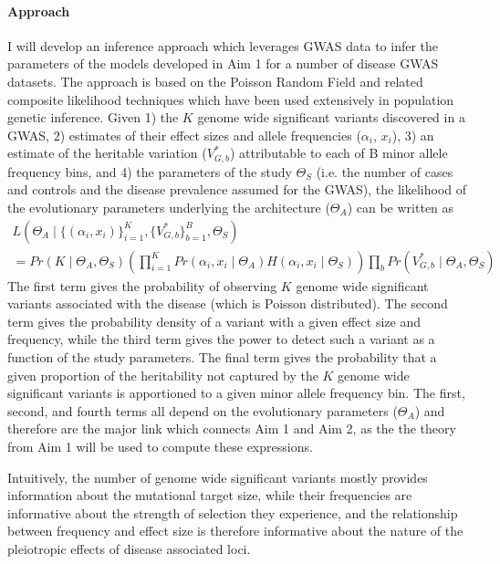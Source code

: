 \documentclass[11pt]{article}
\begin{document}
\paragraph{Approach}
I will develop an inference approach which leverages GWAS data to infer the parameters of the models developed in Aim 1 for a number of disease GWAS datasets. The approach is based on the Poisson Random Field and related composite likelihood techniques which have been used extensively in population genetic inference. Given 1) the $K$ genome wide significant variants discovered in a GWAS, 2) estimates of their effect sizes and allele frequencies ($\alpha_i$, $x_i$), 3) an estimate of the heritable variation ($V^*_{G,b}$) attributable to each of B minor allele frequency bins, and 4) the parameters of the study $\Theta_S$ (i.e. the number of cases and controls and the disease prevalence assumed for the GWAS), the likelihood of the evolutionary parameters underlying the architecture ($\Theta_A$) can be written as
\begin{multline*}
  L\left(\Theta_A \mid \{\left(\alpha_i, x_i\right)\}_{i=1}^K , \{V^*_{G,b}\}_{b=1}^B, \Theta_S\right) \\
               = Pr\left(K \mid \Theta_A , \Theta_S \right) \left( \prod_{i=1}^K Pr\left(\alpha_i , x_i \mid \Theta_A \right) H\left(\alpha_i , x_i \mid \Theta_S\right) \right) \prod_b Pr\left(V^*_{G,b} \mid \Theta_A, \Theta_S \right)
\end{multline*}
The first term gives the probability of observing $K$ genome wide significant variants associated with the disease (which is Poisson distributed). The second term gives the probability density of a variant with a given effect size and frequency, while the third term gives the power to detect such a variant as a function of the study parameters. The final term gives the probability that a given proportion of the heritability not captured by the $K$ genome wide significant variants is apportioned to a given minor allele frequency bin. The first, second, and fourth terms all depend on the evolutionary parameters ($\Theta_A$) and therefore are the major link which connects Aim 1 and Aim 2, as the the theory from Aim 1 will be used to compute these expressions.

Intuitively, the number of genome wide significant variants mostly provides information about the mutational target size, while their frequencies are informative about the strength of selection they experience, and the relationship between frequency and effect size is therefore informative about the nature of the pleiotropic effects of disease associated loci.
\end{document}
